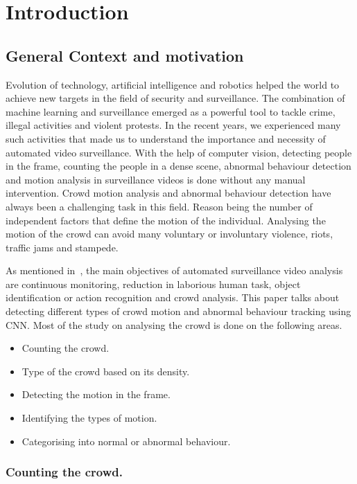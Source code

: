 \chapter{Introduction}
\section{General Context and motivation}
Evolution of technology, artificial intelligence and robotics helped the world to achieve new targets in the
field of security and surveillance. The combination of machine learning and surveillance emerged as a
powerful tool to tackle crime, illegal activities and violent protests. In the recent years, we experienced 
many such activities that made us to understand the importance and necessity of automated video 
surveillance. With the help of computer vision, detecting people in the frame, counting the people in a 
dense scene, abnormal behaviour detection and motion analysis in surveillance videos is done without 
any manual intervention. Crowd motion analysis and abnormal behaviour detection have always been a 
challenging task in this field. Reason being the number of independent factors that define the motion of 
the individual. Analysing the motion of the crowd can avoid many voluntary or involuntary violence, riots, 
traffic jams and stampede.

As mentioned in~\cite{sreenu2019intelligent}, the main objectives of automated surveillance video 
analysis are continuous monitoring, reduction in laborious human task, object identification or action 
recognition and crowd analysis. This paper talks about detecting different types of crowd motion and 
abnormal behaviour tracking using CNN. Most of the study on analysing the crowd is done on the following areas.
\begin{itemize}
	\item Counting the crowd.
	\item Type of the crowd based on its density.
	\item Detecting the motion in the frame.
	\item Identifying the types of motion.
	\item Categorising into normal or abnormal behaviour.
\end{itemize}

\subsection{Counting the crowd.}


